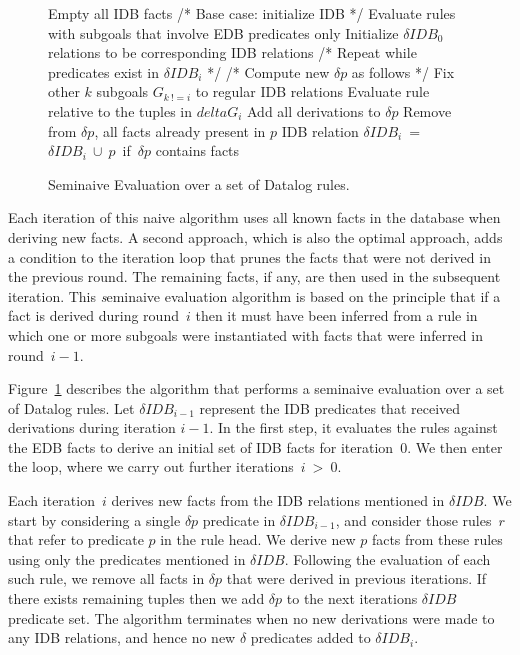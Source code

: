 \begin{figure}
\ssp
\begin{boxedminipage}{\linewidth}
    \begin{algorithmic}[1]
      	\STATE Empty all IDB facts
	\STATE /* Base case: initialize IDB */
        \STATE Evaluate rules with subgoals that involve EDB predicates only
	\STATE Initialize $\delta IDB_0$ relations to be corresponding IDB relations
	\STATE /* Repeat while predicates exist in $\delta IDB_i$ */
                	\STATE /* Compute new $\delta p$ as follows */
				\STATE Fix other $k$ subgoals $G_{k\ != i}$ to regular IDB relations
				\STATE Evaluate rule relative to the tuples in $delta G_i$ 
				\STATE Add all derivations to $\delta p$
			\ENDFOR
        	\ENDFOR
		\STATE Remove from $\delta p$, all facts already present in $p$ IDB relation
		\STATE $\delta IDB_i$\ =\ $\delta IDB_i\ \cup\ p$\ if\ $\delta p$ contains facts
        \ENDFOR
	\ENDWHILE
    \end{algorithmic}
\end{boxedminipage}
\caption{\label{ch:p2:fig:seminaive}Seminaive Evaluation over a set of Datalog rules.}
\end{figure}

Each iteration of this naive algorithm uses all known facts in the database when
deriving new facts.  A second approach, which is also the optimal approach,
adds a condition to the iteration loop that prunes the facts that were not
derived in the previous round.  The remaining facts, if any, are then used
in the subsequent iteration.  This {\emph seminaive evaluation} algorithm is
based on the principle that if a fact is derived during round~$i$ then it must
have been inferred from a rule in which one or more subgoals were instantiated
with facts that were inferred in round~$i-1$.

Figure~\ref{ch:p2:fig:seminaive} describes the algorithm that performs a
seminaive evaluation over a set of Datalog rules.  Let $\delta IDB_{i-1}$
represent the IDB predicates that received derivations during iteration $i-1$.
In the first step, it evaluates the rules against the EDB facts to derive an
initial set of IDB facts for iteration~$0$.  We then enter the loop, where we
carry out further iterations~$i\ >\ 0$.

Each iteration~$i$ derives new facts from the IDB relations mentioned in
$\delta IDB$.  We start by considering a single $\delta p$ predicate in $\delta
IDB_{i-1}$, and consider those rules~$r$ that refer to predicate $p$ in the
rule head.  We derive new $p$ facts from these rules using only the predicates
mentioned in $\delta IDB$.  Following the evaluation of each such rule, we
remove all facts in $\delta p$ that were derived in previous iterations.  If
there exists remaining tuples then we add $\delta p$ to the next iterations
$\delta IDB$ predicate set.  The algorithm terminates when no new derivations
were made to any IDB relations, and hence no new $\delta$ predicates added to
$\delta IDB_i$.


